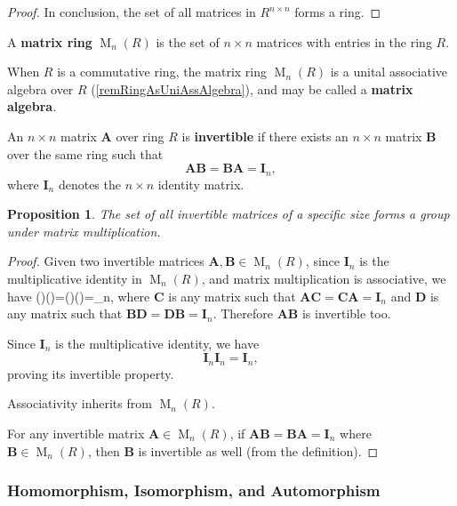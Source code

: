 \documentclass[12pt, letterpaper]{article}
\newcommand{\MM}{\operatorname{M}}
\newcommand{\idm}{\mathbf{I}}
\newcommand{\bfA}{\mathbf{A}}
\newcommand{\bfB}{\mathbf{B}}
\newcommand{\bfC}{\mathbf{C}}
\newcommand{\bfD}{\mathbf{D}}
\newenvironment{eqlong}{\equation\aligned}{\endaligned\endequation}
\newtheorem{prop}{Proposition}[section]
\theoremstyle{definition}
\theoremstyle{remark}
\theoremstyle{definition}
\theoremstyle{plain}
\numberwithin{equation}{section}
\begin{document}
\begin{proof}
		In conclusion, the set of all matrices in $R^{n\times n}$ forms a ring.
		
	\end{proof}
	
	\begin{def*}
		A \textbf{matrix ring} $\MM_n(R)$ is the set of $n\times n$ matrices with entries in the ring $R$.
	\end{def*}
	\begin{def*}
		When $R$ is a commutative ring, the matrix ring $\MM_n(R)$ is a unital associative algebra over $R$
		(\ref{remRingAsUniAssAlgebra}),
		and may be called a \textbf{matrix algebra}. 
	\end{def*}
	
	\begin{def*}
		An $n \times n$ matrix $\mathbf{A}$ over ring $R$ is \textbf{invertible}
		if there exists an $n\times n$ matrix $\mathbf{B}$ over the same ring such that
		\[\mathbf{A}\mathbf{B}=\mathbf{B}\mathbf{A}=\idm_n,\]
		where $\idm_n$ denotes the $n\times n$ identity matrix.
	\end{def*}

	\begin{prop}
		The set of all invertible matrices of a specific size forms a group under matrix multiplication.
	\end{prop}

	\begin{proof}
		Given two invertible matrices $\bfA, \bfB \in \MM_n(R)$,
		since $\idm_n$ is the multiplicative identity in $\MM_n(R)$,
		and matrix multiplication is associative,
		we have
		\begin{eqlong}
			(\bfA\bfB)(\bfD\bfC)=(\bfD\bfC)(\bfA\bfB)=\idm_n,
		\end{eqlong}
		where $\bfC$ is any matrix such that $\bfA\bfC=\bfC\bfA=\idm_n$
		and $\bfD$ is any matrix such that $\bfB\bfD=\bfD\bfB=\idm_n$.
		Therefore $\bfA\bfB$ is invertible too.
		
		Since $\idm_{n}$ is the multiplicative identity,
		we have 
		\[\idm_n\idm_n=\idm_n,\]
		proving its invertible property.
		
		Associativity inherits from $\MM_n(R)$.
		
		For any invertible matrix $\bfA \in \MM_n(R)$, if $\bfA\bfB =\bfB\bfA=\idm_n$ where $\bfB\in\MM_n(R)$,
		then $\bfB$ is invertible as well (from the definition).
	\end{proof}

	\subsubsection{Homomorphism, Isomorphism, and Automorphism}
	
\end{document}
